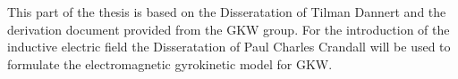 \bigskip
This part of the thesis is based on the Disseratation of Tilman Dannert\cite{Dannert_PHD} and the derivation document provided from the GKW group\cite{GKWDerivation}. For the introduction of the inductive electric field the Disseratation of Paul Charles Crandall\cite{Crandall_PHD} will be used to formulate the electromagnetic gyrokinetic model for GKW.

\newpage

